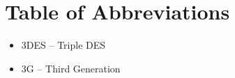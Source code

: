 \section*{Table of Abbreviations}
\begin{itemize}[nolistsep]
\item 3DES -- Triple DES
\item 3G -- Third Generation
\end{itemize}